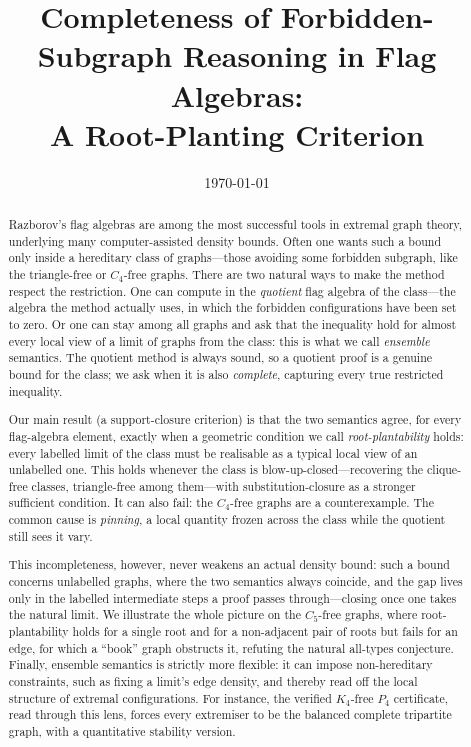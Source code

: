 \documentclass[11pt]{article}
\title{Completeness of Forbidden-Subgraph Reasoning in Flag Algebras:\\
       A Root-Planting Criterion}
\author{}
\date{\today}
\theoremstyle{definition}
\begin{document}
\maketitle

\begin{abstract}
Razborov's flag algebras are among the most successful tools in extremal graph theory,
underlying many computer-assisted density bounds. Often one wants such a bound only inside a hereditary
class of graphs---those avoiding some forbidden subgraph, like the triangle-free or
$C_4$-free graphs.  There are two natural ways to make the method respect the restriction.
One can compute in the \emph{quotient} flag algebra of the class---the algebra the method
actually uses, in which the forbidden configurations have been set to zero.  Or one can
stay among all graphs and ask that the inequality hold for almost every local view of a
limit of graphs from the class: this is what we call \emph{ensemble} semantics.  The
quotient method is always sound, so a quotient proof is a genuine bound for the class; we
ask when it is also \emph{complete}, capturing every true restricted inequality.

Our main result (a support-closure criterion) is that the two semantics agree, for every
flag-algebra element, exactly when a geometric condition we call \emph{root-plantability}
holds: every labelled limit of the class must be realisable as a typical local view of an
unlabelled one.  This holds whenever the class is blow-up-closed---recovering the
clique-free classes, triangle-free among them---with substitution-closure as a stronger sufficient
condition.  It can also fail: the $C_4$-free graphs are a counterexample.  The common
cause is \emph{pinning}, a local quantity frozen across the class while the quotient
still sees it vary.

This incompleteness, however, never weakens an actual density bound: such a bound concerns
unlabelled graphs, where the two semantics always coincide, and the gap lives only in the
labelled intermediate steps a proof passes through---closing once one takes the natural
limit.  We illustrate the whole picture on the $C_5$-free graphs, where root-plantability
holds for a single root and for a non-adjacent pair of roots but fails for an edge, for
which a ``book'' graph obstructs it, refuting the natural all-types conjecture.  Finally,
ensemble semantics is strictly more flexible: it can impose non-hereditary constraints,
such as fixing a limit's edge density, and thereby read off the local structure of
extremal configurations.  For instance, the verified $K_4$-free $P_4$ certificate, read
through this lens, forces every extremiser to be the balanced complete tripartite graph,
with a quantitative stability version.
\end{abstract}
\end{document}
